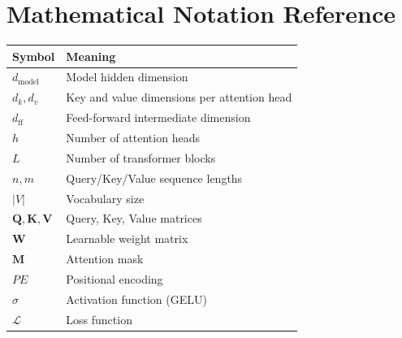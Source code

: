 \documentclass[11pt,a4paper]{article}
\begin{document}
\appendix

\section{Mathematical Notation Reference}

\begin{table}[H]
\centering
\begin{tabular}{|l|l|}
\hline
\textbf{Symbol} & \textbf{Meaning} \\
\hline
$d_{\text{model}}$ & Model hidden dimension \\
$d_k, d_v$ & Key and value dimensions per attention head \\
$d_{\text{ff}}$ & Feed-forward intermediate dimension \\
$h$ & Number of attention heads \\
$L$ & Number of transformer blocks \\
$n, m$ & Query/Key/Value sequence lengths \\
$|V|$ & Vocabulary size \\
$\mathbf{Q}, \mathbf{K}, \mathbf{V}$ & Query, Key, Value matrices \\
$\mathbf{W}$ & Learnable weight matrix \\
$\mathbf{M}$ & Attention mask \\
$PE$ & Positional encoding \\
$\sigma$ & Activation function (GELU) \\
$\mathcal{L}$ & Loss function \\
\hline
\end{tabular}
\end{table}
\end{document}
